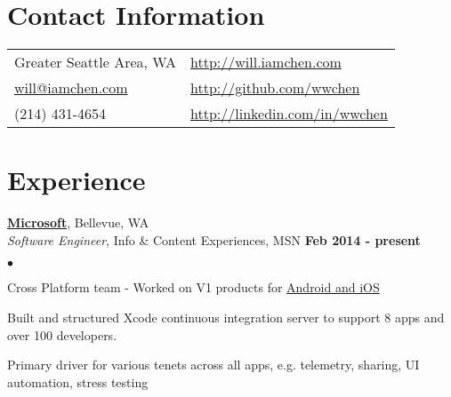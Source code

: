 \documentclass[margin,line]{res}
\newenvironment{list2}
  {\vspace{-4mm}
   \begin{list}{$\bullet$}{
     \setlength{\itemsep}{0in}
     \setlength{\parsep}{0in} \setlength{\parskip}{0in}
     \setlength{\topsep}{0in} \setlength{\partopsep}{0in}
     \setlength{\leftmargin}{0.18in}}}
  {\end{list}}
\begin{document}

\begin{resume}
\section{\sc Contact Information}
\begin{tabular}{@{}p{2.5in}p{4in}}
Greater Seattle Area, WA                           & \href{http://will.iamchen.com}{http://will.iamchen.com} \\
\href{mailto:will@iamchen.com}{will@iamchen.com}   & \href{http://github.com/wwchen}{http://github.com/wwchen} \\ 
(214) 431-4654                                     & \href{http://linkedin.com/in/wwchen}{http://linkedin.com/in/wwchen} \\
\end{tabular}

%
%
\section{\sc Experience}
{\bf \href{http://microsoft.com}{Microsoft}}, Bellevue, WA \\
{\em Software Engineer}, Info \& Content Experiences, MSN                       \hfill {\bf Feb 2014 - present} \\
\begin{list2}
\item Cross Platform team - Worked on V1 products for \href{http://blogs.microsoft.com/blog/2014/09/07/first-look-new-msn/}{Android and iOS}
\item Built and structured  Xcode continuous integration server to support 8 apps and over 100 developers.
\item Primary driver for various tenets across all apps, e.g. telemetry, sharing, UI automation, stress testing
\end{list2}


\end{resume}
\end{document}
